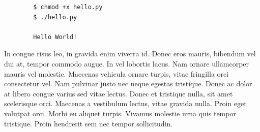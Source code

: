 \documentclass{article}
\begin{document}
\begin{commandline}
	\begin{verbatim}
		$ chmod +x hello.py
		$ ./hello.py

		Hello World!
	\end{verbatim}
\end{commandline}

\begin{warn}[Notice:]
  In congue risus leo, in gravida enim viverra id. Donec eros mauris, bibendum vel dui at, tempor commodo augue. In vel lobortis lacus. Nam ornare ullamcorper mauris vel molestie. Maecenas vehicula ornare turpis, vitae fringilla orci consectetur vel. Nam pulvinar justo nec neque egestas tristique. Donec ac dolor at libero congue varius sed vitae lectus. Donec et tristique nulla, sit amet scelerisque orci. Maecenas a vestibulum lectus, vitae gravida nulla. Proin eget volutpat orci. Morbi eu aliquet turpis. Vivamus molestie urna quis tempor tristique. Proin hendrerit sem nec tempor sollicitudin.
\end{warn}


{}

\end{document}
